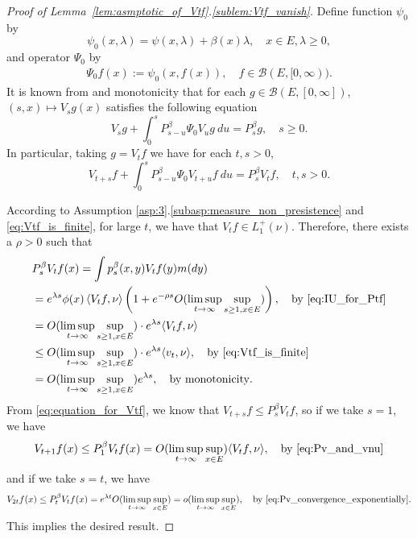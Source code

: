 \documentclass[12pt,a4paper]{amsart}
\numberwithin{equation}{section}
\theoremstyle{plain}
\theoremstyle{definition}
\begin{document}
\begin{proof}[Proof of Lemma~\ref{lem:asmptotic_of_Vtf}.\eqref{sublem:Vtf_vanish}]
Define function $\psi_0$ by
\[
  \psi_0(x,\lambda) = \psi(x,\lambda)+ \beta(x) \lambda,
  \quad x\in E, \lambda \geq 0,
\]
and operator $\Psi_0$ by
\begin{align}
\Psi_0f(x):=\psi_0(x,f(x)), \quad f\in \mathcal B(E,[0,\infty)).
\end{align}
It is known from \cite[Theorem 2.23]{Li2011Measurevalued} and monotonicity that for each $g \in \mathcal B(E,[0,\infty])$, $(s,x)\mapsto V_sg(x)$ satisfies the following equation
\[
  V_sg + \int_0^s P_{s-u}^\beta \Psi_0V_u g~du = P_s^\beta g,
  \quad s\geq 0.
\]
In particular, taking $g=V_tf$ we have for each $t,s>0$,
\begin{equation}
  \label{eq:equation_for_Vtf}
  V_{t+s}f + \int_0^s P^\beta_{s-u}\Psi_0V_{t+u}f~du
  =P^\beta_s V_t f,
  \quad t,s > 0.
\end{equation}

According to Assumption \ref{asp:3}.\eqref{subasp:measure_non_presistence} and \eqref{eq:Vtf_is_finite}, for large $t$, we have that $V_tf \in L^+_1(\nu)$.
Therefore, there exists a $\rho > 0$ such that
\begin{align}
  &P_s^\beta V_t f(x) = \int p^\beta_s(x,y) V_t f (y) m(dy)
  \\ &= e^{\lambda s} \phi(x) \left\langle V_tf, \nu \right\rangle \left (1+e^{-\rho s}O(\limsup_{t\to \infty}\sup_{s\geq 1,x\in E})\right),\quad\text{by~\eqref{eq:IU_for_Ptf}} \label{eq:asmptotic_for_PsVtf}
  \\&= O(\limsup_{t\to \infty}\sup_{s\geq 1, x\in E}) \cdot e^{\lambda s} \langle V_tf,\nu \rangle \label{eq:Pv_and_vnu}
  \\&\leq O(\limsup_{t\to \infty} \sup_{s\geq 1, x\in E}) \cdot e^{\lambda s} \langle v_t,\nu\rangle,\quad\text{by~\eqref{eq:Vtf_is_finite}}
  \\&= O(\limsup_{t\to \infty}\sup_{s\geq 1, x\in E}) e^{\lambda s},\quad\text{by~monotonicity}. \label{eq:Pv_convergence_exponentially}
\end{align}
From \eqref{eq:equation_for_Vtf}, we know that $V_{t+s} f \leq P_s^\beta V_t f$, so if we take $s = 1$, we have
\begin{align}
\label{eq:VtPlusOnef_leq_Vtfnu}
V_{t+1}f(x) \leq P_1^\beta V_t f(x) = O(\limsup_{t
  \to \infty}\sup_{x\in E}) \langle V_tf,\nu\rangle,\quad\text{by~\eqref{eq:Pv_and_vnu}} 
\end{align}
and if we take $s = t$, we have
\begin{align}
\label{eq:Vtf_convergence_to_zero}
V_{2t}f(x) 
\leq P_t^\beta V_tf(x)
= e^{\lambda t} O(\limsup_{t\to \infty} \sup_{x\in E})
  = o(\limsup_{t\to \infty} \sup_{x\in E}),\quad\text{by~\eqref{eq:Pv_convergence_exponentially}}.
\end{align}
This implies the desired result.
\end{proof}
\end{document}
